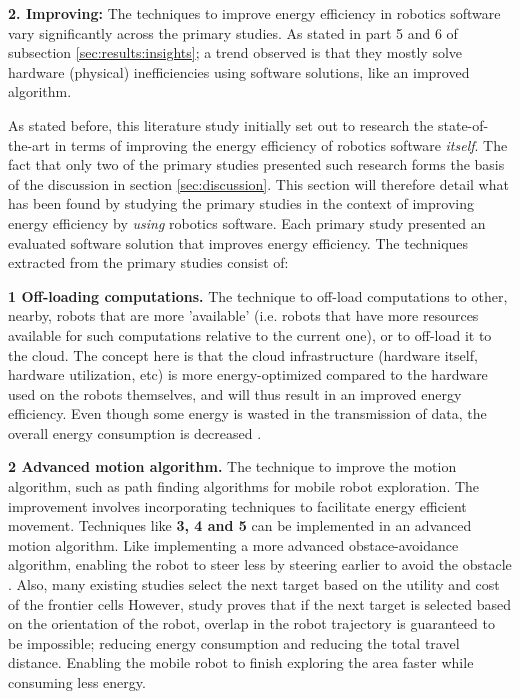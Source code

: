 \vspace{2mm}

\noindent\textbf{2. Improving:}
The techniques to improve energy efficiency in robotics software vary significantly across the primary studies. 
As stated in part 5 and 6 of subsection \ref{sec:results:insights}; a trend observed is that they mostly solve hardware (physical) 
inefficiencies using software solutions, like an improved algorithm.

As stated before, this literature study initially set out to research the state-of-the-art in terms of improving the
energy efficiency of robotics software \textit{itself}.
The fact that only two of the primary studies presented such research forms the basis of the discussion in section \ref{sec:discussion}. 
This section will therefore detail what has been found by studying the primary studies in the context of improving energy efficiency 
by \textit{using} robotics software.
Each primary study presented an evaluated software solution that improves energy efficiency.
The techniques extracted from the primary studies consist of:

\vspace{1mm}

\textbf{1 Off-loading computations.} The technique to off-load computations to other, nearby, robots that are more 'available' 
(i.e. robots that have more resources available for such computations relative to the current one), or to off-load it to the cloud.
The concept here is that the cloud infrastructure (hardware itself, hardware utilization, etc) is more energy-optimized compared to the
hardware used on the robots themselves, and will thus result in an improved energy efficiency.
Even though some energy is wasted in the transmission of data, the overall energy consumption is decreased \cite{rahman2019cloud_robot_offloading}.
    
\vspace{1mm}

\textbf{2 Advanced motion algorithm.} The technique to improve the motion algorithm, such as path finding algorithms for mobile robot exploration. 
The improvement involves incorporating techniques to facilitate energy efficient movement.
Techniques like \textbf{3, 4 and 5} can be implemented in an advanced motion algorithm.
Like implementing a more advanced obstace-avoidance algorithm, enabling the robot to steer less by steering earlier to avoid the obstacle \cite{xie2018mecanum_wheel}.
Also, many existing studies select the next target based on the utility and cost of the frontier cells 
\cite{burgard2005multi_robot_exploration, simmons2000multi_robot_exploration,zlot2002multi_robot_exploration} 
However, study \cite{mei2006mobile_exploration} proves that if the next target is selected based on the orientation of the robot, 
overlap in the robot trajectory is guaranteed to be impossible; reducing energy consumption and reducing the total travel distance.
Enabling the mobile robot to finish exploring the area faster while consuming less energy.
    
